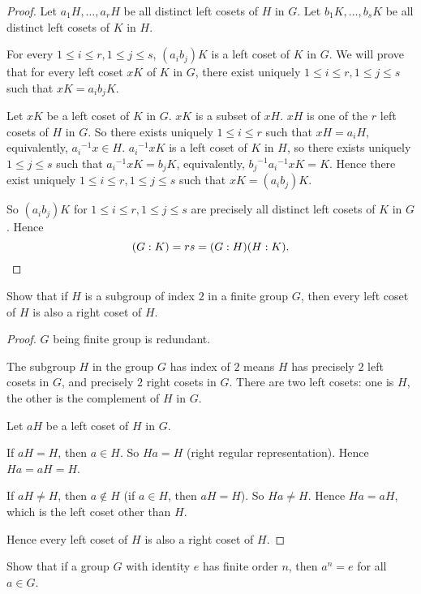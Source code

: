 \begin{proof}
    Let $a_{1}H, \ldots, a_{r}H$ be all distinct left cosets of $H$ in $G$. Let $b_{1}K, \ldots, b_{s}K$ be all distinct left cosets of $K$ in $H$.

    For every $1\leq i\leq r, 1\leq j\leq s$, $(a_{i}b_{j})K$ is a left coset of $K$ in $G$. We will prove that for every left coset $xK$ of $K$ in $G$, there exist uniquely $1\leq i\leq r, 1\leq j\leq s$ such that $xK = a_{i}b_{j}K$.

    Let $xK$ be a left coset of $K$ in $G$. $xK$ is a subset of $xH$. $xH$ is one of the $r$ left cosets of $H$ in $G$. So there exists uniquely $1\leq i\leq r$ such that $xH = a_{i}H$, equivalently, ${a_{i}}^{-1}x\in H$. ${a_{i}}^{-1}xK$ is a left coset of $K$ in $H$, so there exists uniquely $1\leq j\leq s$ such that ${a_{i}}^{-1}xK = b_{j}K$, equivalently, ${b_{j}}^{-1}{a_{i}}^{-1}xK = K$. Hence there exist uniquely $1\leq i\leq r, 1\leq j\leq s$ such that $xK = (a_{i}b_{j})K$.

    So $(a_{i}b_{j})K$ for $1\leq i\leq r, 1\leq j\leq s$ are precisely all distinct left cosets of $K$ in $G$. Hence
    \[
        (G:K) = rs = (G:H)(H:K).\qedhere
    \]
\end{proof}

\begin{exercise}
    Show that if $H$ is a subgroup of index $2$ in a finite group $G$, then every left coset of $H$ is also a right coset of $H$.
\end{exercise}

\begin{proof}
    $G$ being finite group is redundant.

    The subgroup $H$ in the group $G$ has index of $2$ means $H$ has precisely $2$ left cosets in $G$, and precisely $2$ right cosets in $G$. There are two left cosets: one is $H$, the other is the complement of $H$ in $G$.

    Let $aH$ be a left coset of $H$ in $G$.

    If $aH = H$, then $a\in H$. So $Ha = H$ (right regular representation). Hence $Ha = aH = H$.

    If $aH\ne H$, then $a\notin H$ (if $a\in H$, then $aH = H$). So $Ha\ne H$. Hence $Ha = aH$, which is the left coset other than $H$.

    Hence every left coset of $H$ is also a right coset of $H$.
\end{proof}

\begin{exercise}
    Show that if a group $G$ with identity $e$ has finite order $n$, then $a^{n} = e$ for all $a\in G$.
\end{exercise}

